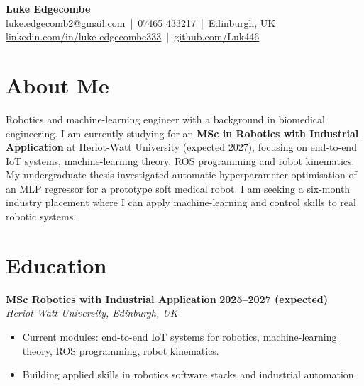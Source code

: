 \documentclass[a4paper,11pt]{article}
\begin{document}
\begin{center}
    {\LARGE \textbf{Luke Edgecombe}} \\[4pt]
    \href{mailto:luke.edgecomb2@gmail.com}{luke.edgecomb2@gmail.com} \,|\, 07465 433217 \,|\, Edinburgh, UK \\
    \href{https://linkedin.com/in/luke-edgecombe333}{linkedin.com/in/luke-edgecombe333} \,|\, 
    \href{https://github.com/Luk446}{github.com/Luk446}
\end{center}

\vspace{0.3cm}


\section*{About Me}
Robotics and machine-learning engineer with a background in biomedical engineering. I am currently studying for an \textbf{MSc in Robotics with Industrial Application} at Heriot-Watt University (expected 2027), focusing on end-to-end IoT systems, machine-learning theory, ROS programming and robot kinematics. My undergraduate thesis investigated automatic hyperparameter optimisation of an MLP regressor for a prototype soft medical robot. I am seeking a six-month industry placement where I can apply machine-learning and control skills to real robotic systems.


\section*{Education}

\textbf{MSc Robotics with Industrial Application} \hfill \textbf{2025--2027 (expected)}\\
    \textit{Heriot-Watt University, Edinburgh, UK}
\begin{itemize}
    \item Current modules: end-to-end IoT systems for robotics, machine-learning theory, ROS programming, robot kinematics.
    \item Building applied skills in robotics software stacks and industrial automation.
\end{itemize}
\end{document}
